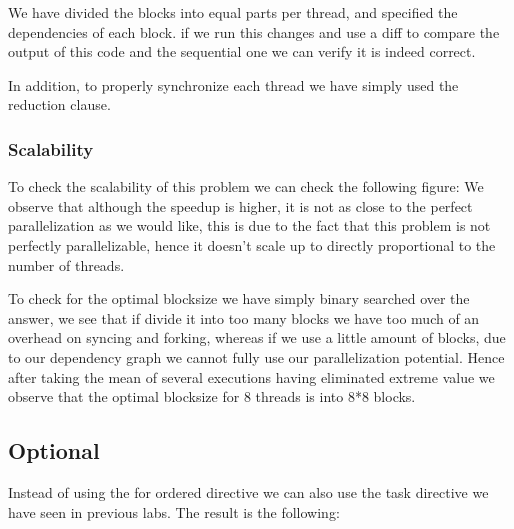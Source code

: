 \documentclass[11pt]{article}
\begin{document}
We have divided the blocks into equal parts per thread, and specified the dependencies of each block. if we run this changes and use a diff to compare the output of this code and the sequential one we can verify it is indeed correct.

In addition, to properly synchronize each thread we have simply used the reduction clause.

\subsubsection{Scalability}
\label{sec:orgd9bc863}
To check the scalability of this problem we can check the following figure:
We observe that although the speedup is higher, it is not as close to the perfect parallelization as we would like, this is due to the fact that this problem is not perfectly parallelizable, hence it doesn't scale up to directly proportional to the number of threads.

To check for the optimal blocksize we have simply binary searched over the answer, we see that if divide it into too many blocks we have too much of an overhead on syncing and forking, whereas if we use a little amount of blocks, due to our dependency graph we cannot fully use our parallelization potential. Hence after taking the mean of several executions having eliminated extreme value we observe that the optimal blocksize for 8 threads is into 8*8 blocks.


\subsection{Optional}
\label{sec:orga61456c}

Instead of using the for ordered directive we can also use the task directive we have seen in previous labs. The result is the following:
\end{document}
